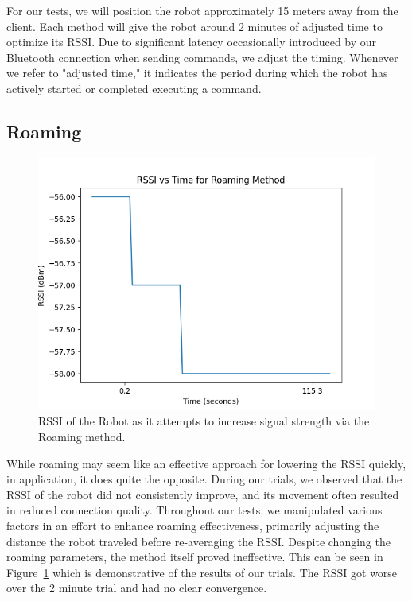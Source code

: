   

For our tests, we will position the robot approximately 15 meters away from the client. Each method will give the robot around 2 minutes of adjusted time to optimize its RSSI. Due to significant latency occasionally introduced by our Bluetooth connection when sending commands, we adjust the timing. Whenever we refer to "adjusted time," it indicates the period during which the robot has actively started or completed executing a command.

\subsection{Roaming}

  

\begin{figure}[tp]

\centering

\includegraphics[scale=0.5]{figures/rssi_roaming}

\caption{RSSI of the Robot as it attempts to increase signal strength via the Roaming method. }

\label{fig:rssi_roaming}

\end{figure}

  

While roaming may seem like an effective approach for lowering the RSSI quickly, in application, it does quite the opposite. During our trials, we observed that the RSSI of the robot did not consistently improve, and its movement often resulted in reduced connection quality. Throughout our tests, we manipulated various factors in an effort to enhance roaming effectiveness, primarily adjusting the distance the robot traveled before re-averaging the RSSI. Despite changing the roaming parameters, the method itself proved ineffective. This can be seen in Figure~\ref{fig:rssi_roaming} which is demonstrative of the results of our trials. The RSSI got worse over the 2 minute trial and had no clear convergence.

